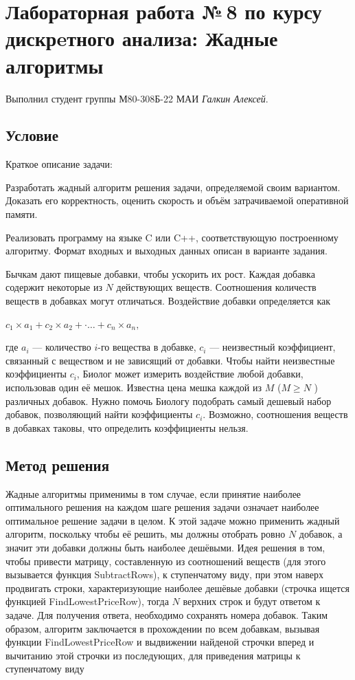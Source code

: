 \documentclass[12pt]{article}
\begin{document}
\section*{Лабораторная работа №\,8 по курсу дискрeтного анализа: Жадные алгоритмы}

Выполнил студент группы М80-308Б-22 МАИ \textit{Галкин Алексей}.

\subsection*{Условие}

Краткое описание задачи:

Разработать жадный алгоритм решения задачи, определяемой своим
вариантом. Доказать его корректность, оценить скорость и объём
затрачиваемой оперативной памяти.

Реализовать программу на языке C или C++, соответствующую
построенному алгоритму. Формат входных и выходных данных описан в
варианте задания.

Бычкам дают пищевые добавки, чтобы ускорить их рост. Каждая добавка
содержит некоторые из $N$ действующих веществ. Соотношения количеств веществ в добавках могут отличаться. Воздействие добавки
определяется как

$c_1\times a_1 + c_2 \times a_2 +·\ldots +c_n \times a_n,$

где $a_i$ — количество $i$-го вещества в добавке, $c_i$ — неизвестный
коэффициент, связанный с веществом и не зависящий от добавки. Чтобы
найти неизвестные коэффициенты $c_i$, Биолог может измерить
воздействие любой добавки, использовав один её мешок. Известна цена
мешка каждой из $M$ ($M \geq N$ ) различных добавок. Нужно помочь Биологу
подобрать самый дешевый набор добавок, позволяющий найти
коэффициенты $c_i$. Возможно, соотношения веществ в добавках таковы,
что определить коэффициенты нельзя.

\subsection*{Метод решения}

Жадные алгоритмы применимы в том случае, если принятие наиболее 
оптимального решения на каждом шаге решения задачи означает наиболее 
оптимальное решение задачи в целом. К этой задаче можно применить жадный 
алгоритм, поскольку чтобы её решить, мы должны отобрать ровно $N$ добавок, 
а значит эти добавки должны быть наиболее дешёвыми. Идея решения в том, 
чтобы привести матрицу, составленную из соотношений веществ (для этого вызывается функция SubtractRows), к ступенчатому 
виду, при этом наверх продвигать строки, характеризующие наиболее дешёвые 
добавки (строчка ищется функцией FindLowestPriceRow), тогда $N$ верхних строк и будут ответом к задаче. Для получения 
ответа, необходимо сохранять номера добавок. Таким образом, алгоритм заключается в прохождении по всем добавкам,
вызывая функции FindLowestPriceRow и выдвижении найденой строчки вперед и вычитанию этой строчки из последующих, для приведения матрицы к ступенчатому виду
\end{document}
